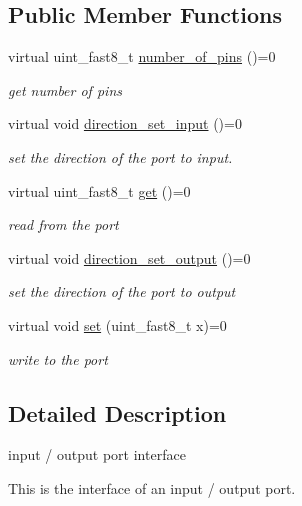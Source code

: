 \subsection*{Public Member Functions}
\begin{DoxyCompactItemize}
\item 
virtual uint\+\_\+fast8\+\_\+t \hyperlink{classhwlib_1_1port__in__out_a44243a6c7664e734563f1809058751bc}{number\+\_\+of\+\_\+pins} ()=0
\begin{DoxyCompactList}\small\item\em get number of pins \end{DoxyCompactList}\item 
virtual void \hyperlink{classhwlib_1_1port__in__out_ac7a9611410ddb9fd5d8e2dd15bff0a3f}{direction\+\_\+set\+\_\+input} ()=0
\begin{DoxyCompactList}\small\item\em set the direction of the port to input. \end{DoxyCompactList}\item 
virtual uint\+\_\+fast8\+\_\+t \hyperlink{classhwlib_1_1port__in__out_a822b44b3dd5b9df225e793896aeba641}{get} ()=0
\begin{DoxyCompactList}\small\item\em read from the port \end{DoxyCompactList}\item 
virtual void \hyperlink{classhwlib_1_1port__in__out_a515b4a6bbde4f2df5bb11cda41234fe4}{direction\+\_\+set\+\_\+output} ()=0
\begin{DoxyCompactList}\small\item\em set the direction of the port to output \end{DoxyCompactList}\item 
virtual void \hyperlink{classhwlib_1_1port__in__out_adaca419a61193e42e06e52afbbc4afe4}{set} (uint\+\_\+fast8\+\_\+t x)=0
\begin{DoxyCompactList}\small\item\em write to the port \end{DoxyCompactList}\end{DoxyCompactItemize}


\subsection{Detailed Description}
input / output port interface 

This is the interface of an input / output port. 

